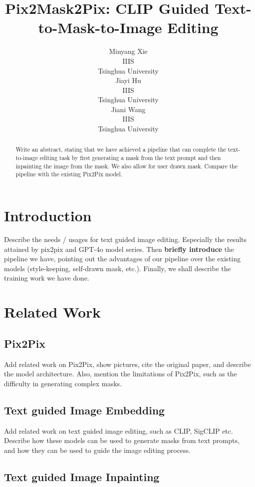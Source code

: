 \documentclass{article}
\title{Pix2Mask2Pix: CLIP Guided Text-to-Mask-to-Image Editing}
\author{%
  Minyang Xie\\
  IIIS\\
  Tsinghua University\\
  \And
  Jiayi Hu \\
  IIIS \\
  Tsinghua University \\
  \And
  Jiani Wang \\
  IIIS \\
  Tsinghua University \\
}
\begin{document}
\maketitle


\begin{abstract}
  Write an abstract, stating that we have achieved a pipeline that can complete the text-to-image editing task by first generating a mask from the text prompt and then inpainting the image from the mask. We also allow for user drawn mask. Compare the pipeline with the existing Pix2Pix model.
\end{abstract}


\section{Introduction}


Describe the needs / usages for text guided image editing. Especially the results attained by pix2pix and GPT-4o model series. Then \textbf{briefly introduce} the pipeline we have, pointing out the advantages of our pipeline over the existing models (style-keeping, self-drawn mask, etc.). Finally, we shall describe the training work we have done.


\section{Related Work}


\subsection{Pix2Pix}


Add related work on Pix2Pix, show pictures, cite the original paper, and describe the model architecture. Also, mention the limitations of Pix2Pix, such as the difficulty in generating complex masks.


\subsection{Text guided Image Embedding}


Add related work on text guided image editing, such as CLIP, SigCLIP etc. Describe how these models can be used to generate masks from text prompts, and how they can be used to guide the image editing process.


\subsection{Text guided Image Inpainting}
\end{document}
